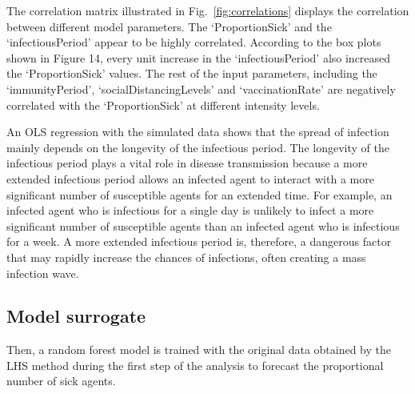 \documentclass[smallextended]{svjour3}       %
\begin{document}
The correlation matrix illustrated in Fig.~\ref{fig:correlations} displays the correlation between different model parameters. The ‘ProportionSick’ and the ‘infectiousPeriod’ appear to be highly correlated. According to the box plots shown in Figure 14, every unit increase in the ‘infectiousPeriod’ also increased the ‘ProportionSick’ values. The rest of the input parameters, including the ‘immunityPeriod’, ‘socialDistancingLevels’ and ‘vaccinationRate’ are negatively correlated with the ‘ProportionSick’ at different intensity levels.


An OLS regression with the simulated data shows that the spread of infection mainly depends on the longevity of the infectious period. The longevity of the infectious period plays a vital role in disease transmission because a more extended infectious period allows an infected agent to interact with a more significant number of susceptible agents for an extended time. For example, an infected agent who is infectious for a single day is unlikely to infect a more significant number of susceptible agents than an infected agent who is infectious for a week. A more extended infectious period is, therefore, a dangerous factor that may rapidly increase the chances of infections, often creating a mass infection wave.

\subsection{Model surrogate}

Then, a random forest model is trained with the original data obtained by the LHS method during the first step of the analysis to forecast the proportional number of sick agents.
\end{document}
